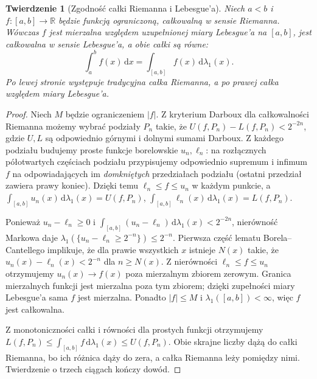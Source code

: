 \documentclass[11pt,a4paper,oneside]{book}
\numberwithin{equation}{chapter}
\theoremstyle{plain}
\newtheorem{twierdzenie}{Twierdzenie}[chapter]
\theoremstyle{definition}
\theoremstyle{remark}
\begin{document}
\begin{twierdzenie}[Zgodność całki Riemanna i Lebesgue'a]
\label{thm:riemann-to-lebesgue}
Niech $a<b$ i $f:[a,b]\to\mathbb R$ będzie funkcją
ograniczoną, całkowalną w sensie Riemanna.
Wówczas $f$ jest mierzalna względem uzupełnionej
miary Lebesgue'a na $[a,b]$, jest całkowalna
w sensie Lebesgue'a, a obie całki są równe:
\[
\int_a^b f(x)\,\mathrm dx
=\int_{[a,b]}f(x)\,\mathrm d\lambda_1(x).
\]
Po lewej stronie występuje tradycyjna całka Riemanna,
a po prawej całka względem miary Lebesgue'a.
\end{twierdzenie}
\begin{proof}
Niech $M$ będzie ograniczeniem $|f|$.
Z kryterium Darboux dla całkowalności Riemanna
możemy wybrać podziały $P_n$ takie, że
$U(f,P_n)-L(f,P_n)<2^{-2n}$,
gdzie $U,L$ są odpowiednio górnymi i dolnymi
sumami Darboux. Z każdego podziału budujemy
proste funkcje borelowskie $u_n,\ell_n$:
na rozłącznych półotwartych częściach podziału
przypisujemy odpowiednio supremum i infimum $f$
na odpowiadających im \emph{domkniętych} przedziałach
podziału (ostatni przedział zawiera prawy koniec).
Dzięki temu $\ell_n\le f\le u_n$ w każdym punkcie,
a $\int_{[a,b]}u_n(x)\,\mathrm d\lambda_1(x)=U(f,P_n)$,
$\int_{[a,b]}\ell_n(x)\,\mathrm d\lambda_1(x)=L(f,P_n)$.

Ponieważ $u_n-\ell_n\ge0$ i
$\int_{[a,b]}(u_n-\ell_n)\,\mathrm d\lambda_1(x)
<2^{-2n}$, nierówność Markowa daje
$\lambda_1(\{u_n-\ell_n\ge2^{-n}\})\le2^{-n}$.
Pierwsza część lematu Borela--Cantellego implikuje,
że dla prawie wszystkich $x$ istnieje $N(x)$ takie,
że $u_n(x)-\ell_n(x)<2^{-n}$ dla $n\ge N(x)$.
Z nierówności $\ell_n\le f\le u_n$ otrzymujemy
$u_n(x)\to f(x)$ poza mierzalnym zbiorem zerowym.
Granica mierzalnych funkcji jest mierzalna poza
tym zbiorem; dzięki zupełności miary Lebesgue'a
sama $f$ jest mierzalna. Ponadto $|f|\le M$
i $\lambda_1([a,b])<\infty$, więc $f$ jest całkowalna.

Z monotoniczności całki i równości dla prostych
funkcji otrzymujemy
$L(f,P_n)\le\int_{[a,b]}f\,\mathrm d\lambda_1(x)
\le U(f,P_n)$. Obie skrajne liczby dążą do
całki Riemanna, bo ich różnica dąży do zera,
a całka Riemanna leży pomiędzy nimi.
Twierdzenie o trzech ciągach kończy dowód.
\end{proof}
\end{document}
